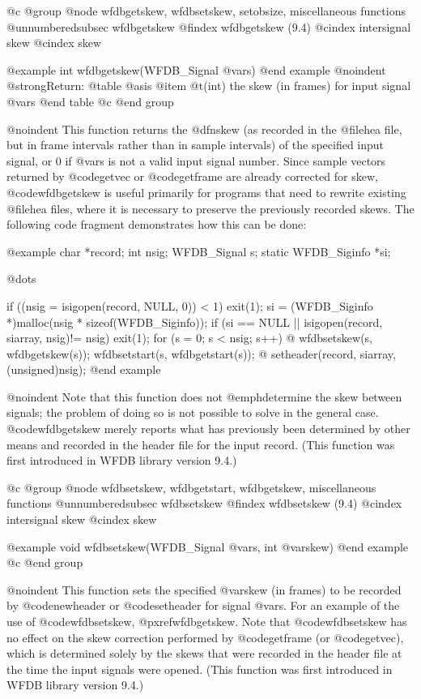 {{{{{{{{{{@c @group
@node     wfdbgetskew, wfdbsetskew, setobsize, miscellaneous functions
@unnumberedsubsec wfdbgetskew
@findex wfdbgetskew (9.4)
@cindex intersignal skew
@cindex skew

@example
int wfdbgetskew(WFDB_Signal @var{s})
@end example
@noindent
@strong{Return:}
@table @asis
@item @t{(int)}
the skew (in frames) for input signal @var{s}
@end table
@c @end group

@noindent
This function returns the @dfn{skew} (as recorded in the @file{hea}
file, but in frame intervals rather than in sample intervals) of the
specified input signal, or 0 if @var{s} is not a valid input signal
number.  Since sample vectors returned by @code{getvec} or
@code{getframe} are already corrected for skew, @code{wfdbgetskew} is
useful primarily for programs that need to rewrite existing
@file{hea} files, where it is necessary to preserve the previously
recorded skews.  The following code fragment demonstrates how this can
be done:

@example
char *record;
int nsig;
WFDB_Signal s;
static WFDB_Siginfo *si;

@dots{}

if ((nsig = isigopen(record, NULL, 0)) < 1)
    exit(1);
si = (WFDB_Siginfo *)malloc(nsig * sizeof(WFDB_Siginfo));
if (si == NULL || isigopen(record, siarray, nsig)!= nsig)
    exit(1);
for (s = 0; s < nsig; s++) @{
    wfdbsetskew(s, wfdbgetskew(s));
    wfdbsetstart(s, wfdbgetstart(s));
@}
setheader(record, siarray, (unsigned)nsig);
@end example

@noindent
Note that this function does not @emph{determine} the skew between
signals;  the problem of doing so is not possible to solve in the
general case.  @code{wfdbgetskew} merely reports what has previously been
determined by other means and recorded in the header file for the input
record.  (This function was first introduced in WFDB library version 9.4.)

@c @group
@node     wfdbsetskew, wfdbgetstart, wfdbgetskew, miscellaneous functions
@unnumberedsubsec wfdbsetskew
@findex wfdbsetskew (9.4)
@cindex intersignal skew
@cindex skew

@example
void wfdbsetskew(WFDB_Signal @var{s}, int @var{skew})
@end example
@c @end group

@noindent
This function sets the specified @var{skew} (in frames) to be recorded
by @code{newheader} or @code{setheader} for signal @var{s}.  For an
example of the use of @code{wfdbsetskew}, @pxref{wfdbgetskew}.  Note that
@code{wfdbsetskew} has no effect on the skew correction performed by
@code{getframe} (or @code{getvec}), which is determined solely by the
skews that were recorded in the header file at the time the input
signals were opened.  (This function was first introduced in WFDB library
version 9.4.)

}}}}}}}}}}

